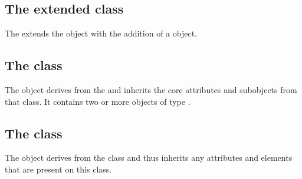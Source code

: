
\subsection{The extended  class}
\label{model-class}




The \FooPackage extends the  object with the addition of
a \ListOfApples object.

\subsection{The  class}
\label{listofapples-class}


The \ListOfApples object derives from the  and inherits the
core attributes and subobjects from that class. It contains two or more
objects of type \Apple.

\subsection{The  class}
\label{apple-class}




The \Apple object derives from the \SBase class and thus inherits any
attributes and elements that are present on this class.
